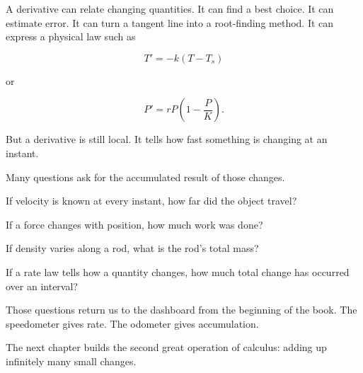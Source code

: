 A derivative can relate changing quantities.  It can find a best choice.  It can estimate
error.  It can turn a tangent line into a root-finding method.  It can express a physical
law such as

\[
T'=-k(T-T_s)
\]

or

\[
P'=rP\left(1-\frac{P}{K}\right).
\]

But a derivative is still local.  It tells how fast something is changing at an instant.

Many questions ask for the accumulated result of those changes.

If velocity is known at every instant, how far did the object travel?

If a force changes with position, how much work was done?

If density varies along a rod, what is the rod's total mass?

If a rate law tells how a quantity changes, how much total change has occurred over
an interval?

Those questions return us to the dashboard from the beginning of the book.  The
speedometer gives rate.  The odometer gives accumulation.

The next chapter builds the second great operation of calculus: adding up infinitely
many small changes.
